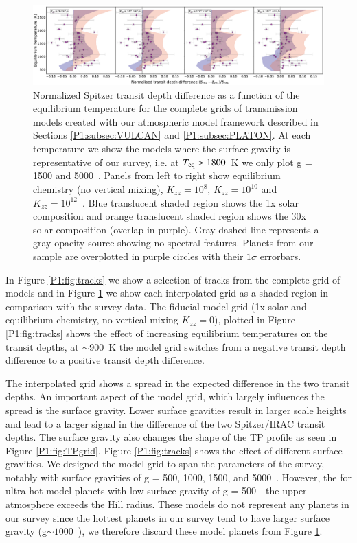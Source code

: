 \begin{figure}
    \centering
    \includegraphics[width=\linewidth]{Kzzmodels.pdf}
    \caption{Normalized Spitzer transit depth difference as a function of the equilibrium temperature for the complete grids of transmission models created with our atmospheric model framework described in Sections \ref{P1:subsec:VULCAN} and \ref{P1:subsec:PLATON}. At each temperature we show the models where the surface gravity is representative of our survey, i.e. at $T_{\rm eq}>1800$~K we only plot g = 1500 and 5000~\cmss. Panels from left to right show equilibrium chemistry (no vertical mixing), $K_{zz} = 10^8$, $K_{zz} = 10^{10}$ and $K_{zz} = 10^{12}$~\cmcms. Blue translucent shaded region shows the 1x solar composition and orange translucent shaded region shows the 30x solar composition (overlap in purple). Gray dashed line represents a gray opacity source showing no spectral features. Planets from our sample are overplotted in purple circles with their $1\sigma$ errorbars.}
    \label{P1:fig:Kzzmodels}
\end{figure}

In Figure \ref{P1:fig:tracks} we show a selection of tracks from the complete grid of models and in Figure \ref{P1:fig:Kzzmodels} we show each interpolated grid as a shaded region in comparison with the survey data. The fiducial model grid (1x solar and equilibrium chemistry, no vertical mixing $K_{zz}=0$), plotted in Figure \ref{P1:fig:tracks} shows the effect of increasing equilibrium temperatures on the transit depths, at $\sim$900~K the model grid switches from a negative transit depth difference to a positive transit depth difference.

The interpolated grid shows a spread in the expected difference in the two transit depths. An important aspect of the model grid, which largely influences the spread is the surface gravity. Lower surface gravities result in larger scale heights and lead to a larger signal in the difference of the two Spitzer/IRAC transit depths. The surface gravity also changes the shape of the TP profile as seen in Figure \ref{P1:fig:TPgrid}. Figure \ref{P1:fig:tracks} shows the effect of different surface gravities. We designed the model grid to span the parameters of the survey, notably with surface gravities of g = 500, 1000, 1500, and 5000~\cmss. However, the for ultra-hot model planets with low surface gravity of g = 500~\cmss~the upper atmosphere exceeds the Hill radius. These models do not represent any planets in our survey since the hottest planets in our survey tend to have larger surface gravity (g$\sim1000$~\cmss), we therefore discard these model planets from Figure \ref{P1:fig:Kzzmodels}.

